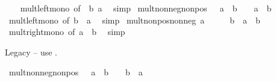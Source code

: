 \begin{isabellebody}
%
\isadelimproof
\ \ %
\endisadelimproof
%
\isatagproof
{}\isamarkupfalse%
\ mult{\isacharunderscore}{\kern0pt}left{\isacharunderscore}{\kern0pt}mono\ {\isacharbrackleft}{\kern0pt}of\ {}\ b\ a{\isacharbrackright}{\kern0pt}\ \isamarkupfalse%
\ simp%
\endisatagproof
{\isafoldproof}%
%
\isadelimproof
\isanewline
%
\endisadelimproof
\isanewline
{}\isamarkupfalse%
\ mult{\isacharunderscore}{\kern0pt}nonneg{\isacharunderscore}{\kern0pt}nonpos{\isacharcolon}{\kern0pt}\ {\isachardoublequoteopen}{}\ {\isasymle}\ a\ {\isasymLongrightarrow}\ b\ {\isasymle}\ {}\ {\isasymLongrightarrow}\ a\ {\isacharasterisk}{\kern0pt}\ b\ {\isasymle}\ {}{\isachardoublequoteclose}\isanewline
%
\isadelimproof
\ \ %
\endisadelimproof
%
\isatagproof
{}\isamarkupfalse%
\ mult{\isacharunderscore}{\kern0pt}left{\isacharunderscore}{\kern0pt}mono\ {\isacharbrackleft}{\kern0pt}of\ b\ {}\ a{\isacharbrackright}{\kern0pt}\ \isamarkupfalse%
\ simp%
\endisatagproof
{\isafoldproof}%
%
\isadelimproof
\isanewline
%
\endisadelimproof
\isanewline
{}\isamarkupfalse%
\ mult{\isacharunderscore}{\kern0pt}nonpos{\isacharunderscore}{\kern0pt}nonneg{\isacharcolon}{\kern0pt}\ {\isachardoublequoteopen}a\ {\isasymle}\ {}\ {\isasymLongrightarrow}\ {}\ {\isasymle}\ b\ {\isasymLongrightarrow}\ a\ {\isacharasterisk}{\kern0pt}\ b\ {\isasymle}\ {}{\isachardoublequoteclose}\isanewline
%
\isadelimproof
\ \ %
\endisadelimproof
%
\isatagproof
{}\isamarkupfalse%
\ mult{\isacharunderscore}{\kern0pt}right{\isacharunderscore}{\kern0pt}mono\ {\isacharbrackleft}{\kern0pt}of\ a\ {}\ b{\isacharbrackright}{\kern0pt}\ \isamarkupfalse%
\ simp%
\endisatagproof
{\isafoldproof}%
%
\isadelimproof
%
\endisadelimproof
%
\begin{isamarkuptext}%
Legacy -- use .%
\end{isamarkuptext}\isamarkuptrue%
\isamarkupfalse%
\ mult{\isacharunderscore}{\kern0pt}nonneg{\isacharunderscore}{\kern0pt}nonpos{}{\isacharcolon}{\kern0pt}\ {\isachardoublequoteopen}{}\ {\isasymle}\ a\ {\isasymLongrightarrow}\ b\ {\isasymle}\ {}\ {\isasymLongrightarrow}\ b\ {\isacharasterisk}{\kern0pt}\ a\ {\isasymle}\ {}{\isachardoublequoteclose}\isanewline
%
\isadelimproof
\ \ %
\endisadelimproof
%
\isatagproof
{}\isamarkupfalse%

\end{isabellebody}
